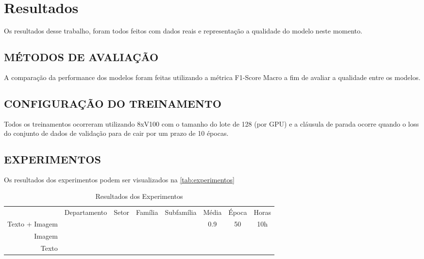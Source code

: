 \chapter{Resultados}

Os resultados desse trabalho, foram todos feitos com dados reais e representação a qualidade do modelo neste momento.

\section{MÉTODOS DE AVALIAÇÃO}

A comparação da performance dos modelos foram feitas utilizando a métrica F1-Score Macro a fim de avaliar a qualidade entre os modelos.

\section{CONFIGURAÇÃO DO TREINAMENTO}

Todos os treinamentos ocorreram utilizando 8xV100 com o tamanho do lote de 128 (por GPU) e a cláusula de parada ocorre quando o loss do conjunto de dados de validação para de cair por um prazo de 10 épocas.

\section{EXPERIMENTOS}

Os resultados dos experimentos podem ser visualizados na \autoref{tab:experimentos}

\begin{table}[h]
\centering
\caption{Resultados dos Experimentos}
\label{tab:experimentos}
\begin{tabularx}{\textwidth}{r|c|c|c|c|c|c|c}
               & Departamento & Setor & Família & Subfamília & Média & Época & Horas \\
Texto + Imagem &              &       &         &            &  0.9  &   50  &   10h \\
Imagem         &              &       &         &            &       &       &       \\
Texto          &              &       &         &            &       &       &        
\end{tabularx}
\end{table}
